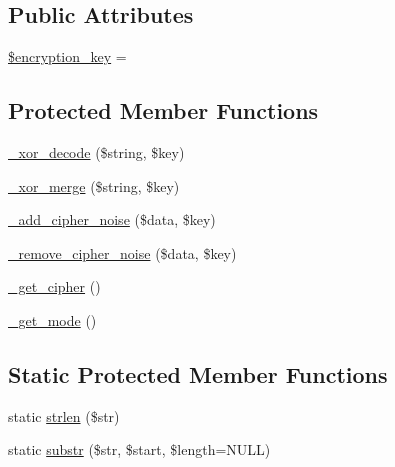 \subsection*{Public Attributes}
\begin{DoxyCompactItemize}
\item 
\mbox{\hyperlink{class_c_i___encrypt_a35bbf76a5bcca90ca9b39368ed28121c}{\$encryption\+\_\+key}} = \textquotesingle{}\textquotesingle{}
\end{DoxyCompactItemize}
\subsection*{Protected Member Functions}
\begin{DoxyCompactItemize}
\item 
\mbox{\hyperlink{class_c_i___encrypt_aa0cee348c5cef9a3a06c22a92c38fd4f}{\+\_\+xor\+\_\+decode}} (\$string, \$key)
\item 
\mbox{\hyperlink{class_c_i___encrypt_aaf2644aeb5ec418eb4ddc2d70f372ada}{\+\_\+xor\+\_\+merge}} (\$string, \$key)
\item 
\mbox{\hyperlink{class_c_i___encrypt_ada423e99876a54e7bc33afc9899d01a2}{\+\_\+add\+\_\+cipher\+\_\+noise}} (\$data, \$key)
\item 
\mbox{\hyperlink{class_c_i___encrypt_a35c2675b85803d42231d1f8353fa8dac}{\+\_\+remove\+\_\+cipher\+\_\+noise}} (\$data, \$key)
\item 
\mbox{\hyperlink{class_c_i___encrypt_a663ee049f0b7596a0e4925a3eb2db062}{\+\_\+get\+\_\+cipher}} ()
\item 
\mbox{\hyperlink{class_c_i___encrypt_a8c6526d9458754249ee7268ead883a6c}{\+\_\+get\+\_\+mode}} ()
\end{DoxyCompactItemize}
\subsection*{Static Protected Member Functions}
\begin{DoxyCompactItemize}
\item 
static \mbox{\hyperlink{class_c_i___encrypt_a4c29a687d4ed62c26a10e41d98930d5f}{strlen}} (\$str)
\item 
static \mbox{\hyperlink{class_c_i___encrypt_a101caef57ef0b165da5747e2c2e6c9dc}{substr}} (\$str, \$start, \$length=N\+U\+LL)
\end{DoxyCompactItemize}
